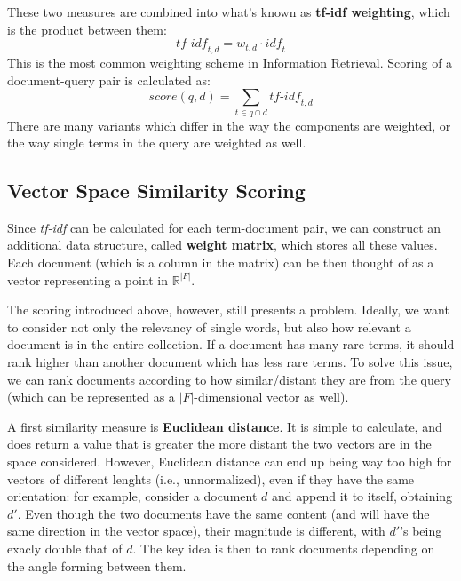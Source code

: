 These two measures are combined into what's known as \textbf{tf-idf weighting}, which is the product between them:
\begin{equation*}
    \textit{tf-idf}_{t,d} = w_{t,d} \cdot \textit{idf}_t
\end{equation*}
This is the most common weighting scheme in Information Retrieval. Scoring of a document-query pair is calculated as:
\begin{equation*}
    \textit{score}(q,d) = \sum_{t \in q \cap d} \textit{tf-idf}_{t,d}
\end{equation*}
There are many variants which differ in the way the components are weighted, or the way single terms in the query are weighted as well.

\subsection{Vector Space Similarity Scoring}

Since \textit{tf-idf} can be calculated for each term-document pair, we can construct an additional data structure, called \textbf{weight matrix}, which stores all these values. Each document (which is a column in the matrix) can be then thought of as a vector representing a point in $\mathbb{R}^{|F|}$.

The scoring introduced above, however, still presents a problem. Ideally, we want to consider not only the relevancy of single words, but also how relevant a document is in the entire collection. If a document has many rare terms, it should rank higher than another document which has less rare terms. To solve this issue, we can rank  documents according to how similar/distant they are from the query (which can be represented as a $|F|$-dimensional vector as well).

A first similarity measure is \textbf{Euclidean distance}. It is simple to calculate, and does return a value that is greater the more distant the two vectors are in the space considered. However, Euclidean distance can end up being way too high for vectors of different lenghts (i.e., unnormalized), even if they have the same orientation: for example, consider a document $d$ and append it to itself, obtaining $d'$. Even though the two documents have the same content (and will have the same direction in the vector space), their magnitude is different, with $d'$'s being exacly double that of $d$. The key idea is then to rank documents depending on the angle forming between them.

